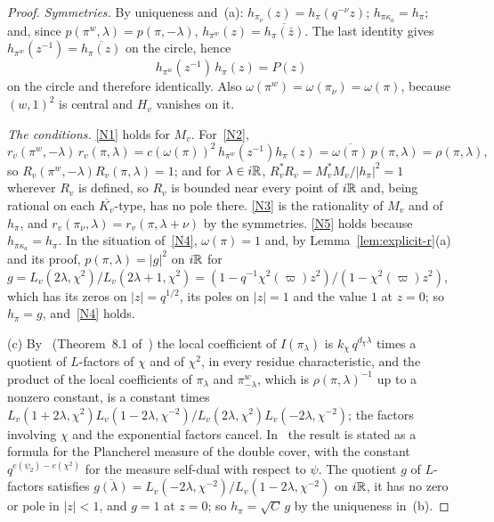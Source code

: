 \begin{proof}
\emph{Symmetries.} By uniqueness and~(a): $h_{\pi_\nu}(z)=h_\pi(q^{-\nu}
z)$; $h_{\pi\kappa_a}=h_\pi$; and, since $p(\pi^w,\lambda)=p(\pi,
-\lambda)$, $h_{\pi^w}(z)=\overline{h_\pi(\bar z)}$. The last identity
gives $h_{\pi^w}(z^{-1})=\overline{h_\pi(z)}$ on the circle, hence
\[
h_{\pi^w}(z^{-1})\,h_\pi(z)=P(z)
\]
on the circle and therefore identically. Also $\omega(\pi^w)=\omega(\pi_\nu)
=\omega(\pi)$, because $(w,1)^2$ is central and $H_v$ vanishes on it.

\emph{The conditions.} \ref{N1} holds for $M_v$. For~\ref{N2},
\[
r_v(\pi^w,-\lambda)\,r_v(\pi,\lambda)=c(\omega(\pi))^2\,h_{\pi^w}(z^{-1})
h_\pi(z)=\overline{\omega(\pi)}\,p(\pi,\lambda)=\rho(\pi,\lambda),
\]
so $R_v(\pi^w,-\lambda)R_v(\pi,\lambda)=1$; and for $\lambda\in i\mathbb{R}$,
$R_v^*R_v=M_v^*M_v/|h_\pi|^2=1$ wherever $R_v$ is defined, so $R_v$ is
bounded near every point of $i\mathbb{R}$ and, being rational on each
$\overline{K_v}$-type, has no pole there. \ref{N3} is the rationality of
$M_v$ and of $h_\pi$, and $r_v(\pi_\nu,\lambda)=r_v(\pi,\lambda+\nu)$ by
the symmetries. \ref{N5} holds because $h_{\pi\kappa_a}=h_\pi$. In the
situation of~\ref{N4}, $\omega(\pi)=1$ and, by Lemma~\ref{lem:explicit-r}(a)
and its proof, $p(\pi,\lambda)=|g|^2$ on $i\mathbb{R}$ for $g=L_v(2\lambda,
\chi^2)/L_v(2\lambda+1,\chi^2)=(1-q^{-1}\chi^2(\varpi)z^2)/(1-\chi^2(\varpi)
z^2)$, which has its zeros on $|z|=q^{1/2}$, its poles on $|z|=1$ and the
value $1$ at $z=0$; so $h_\pi=g$, and~\ref{N4} holds.

(c) By~\cite{Sz09} (Theorem~8.1 of~\cite{Sz10}) the local coefficient of $I(\pi_\lambda)$ is
$k_\chi\,q^{d_\chi\lambda}$ times a quotient of $L$-factors of $\chi$ and
of $\chi^2$, in every residue characteristic, and the product of the
local coefficients of $\pi_\lambda$ and $\pi^w_{-\lambda}$, which is
$\rho(\pi,\lambda)^{-1}$ up to a nonzero constant, is a constant times
$L_v(1+2\lambda,\chi^2)L_v(1-2\lambda,\chi^{-2})/L_v(2\lambda,\chi^2)
L_v(-2\lambda,\chi^{-2})$; the factors involving $\chi$ and the
exponential factors cancel. In~\cite[(5.8)]{Sz16} the result is stated
as a formula for the Plancherel measure of the double cover, with
the constant $q^{e(\psi_2)-e(\chi^2)}$ for the measure self-dual with
respect to $\psi$. The quotient $g$ of $L$-factors satisfies
$\overline{g(\lambda)}=L_v(-2\lambda,\chi^{-2})/L_v(1-2\lambda,\chi^{-2})$
on $i\mathbb{R}$, it has no zero or pole in $|z|<1$, and $g=1$ at $z=0$; so
$h_\pi=\sqrt C\,g$ by the uniqueness in~(b).
\end{proof}

